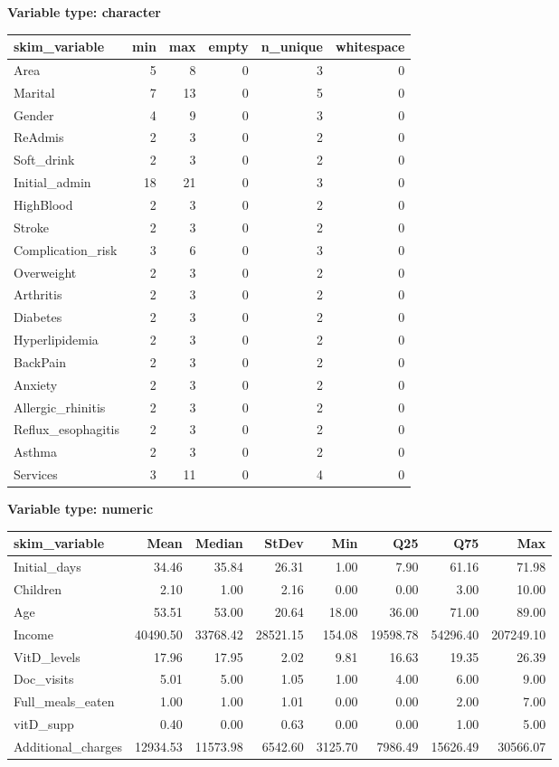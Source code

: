 \documentclass[
]{article}
\begin{document}
\textbf{Variable type: character}

\begin{longtable}[]{@{}lrrrrr@{}}
\toprule
skim\_variable & min & max & empty & n\_unique & whitespace \\
\midrule
\endhead
Area & 5 & 8 & 0 & 3 & 0 \\
Marital & 7 & 13 & 0 & 5 & 0 \\
Gender & 4 & 9 & 0 & 3 & 0 \\
ReAdmis & 2 & 3 & 0 & 2 & 0 \\
Soft\_drink & 2 & 3 & 0 & 2 & 0 \\
Initial\_admin & 18 & 21 & 0 & 3 & 0 \\
HighBlood & 2 & 3 & 0 & 2 & 0 \\
Stroke & 2 & 3 & 0 & 2 & 0 \\
Complication\_risk & 3 & 6 & 0 & 3 & 0 \\
Overweight & 2 & 3 & 0 & 2 & 0 \\
Arthritis & 2 & 3 & 0 & 2 & 0 \\
Diabetes & 2 & 3 & 0 & 2 & 0 \\
Hyperlipidemia & 2 & 3 & 0 & 2 & 0 \\
BackPain & 2 & 3 & 0 & 2 & 0 \\
Anxiety & 2 & 3 & 0 & 2 & 0 \\
Allergic\_rhinitis & 2 & 3 & 0 & 2 & 0 \\
Reflux\_esophagitis & 2 & 3 & 0 & 2 & 0 \\
Asthma & 2 & 3 & 0 & 2 & 0 \\
Services & 3 & 11 & 0 & 4 & 0 \\
\bottomrule
\end{longtable}

\textbf{Variable type: numeric}

\begin{longtable}[]{@{}lrrrrrrr@{}}
\toprule
skim\_variable & Mean & Median & StDev & Min & Q25 & Q75 & Max \\
\midrule
\endhead
Initial\_days & 34.46 & 35.84 & 26.31 & 1.00 & 7.90 & 61.16 & 71.98 \\
Children & 2.10 & 1.00 & 2.16 & 0.00 & 0.00 & 3.00 & 10.00 \\
Age & 53.51 & 53.00 & 20.64 & 18.00 & 36.00 & 71.00 & 89.00 \\
Income & 40490.50 & 33768.42 & 28521.15 & 154.08 & 19598.78 & 54296.40 &
207249.10 \\
VitD\_levels & 17.96 & 17.95 & 2.02 & 9.81 & 16.63 & 19.35 & 26.39 \\
Doc\_visits & 5.01 & 5.00 & 1.05 & 1.00 & 4.00 & 6.00 & 9.00 \\
Full\_meals\_eaten & 1.00 & 1.00 & 1.01 & 0.00 & 0.00 & 2.00 & 7.00 \\
vitD\_supp & 0.40 & 0.00 & 0.63 & 0.00 & 0.00 & 1.00 & 5.00 \\
Additional\_charges & 12934.53 & 11573.98 & 6542.60 & 3125.70 & 7986.49
& 15626.49 & 30566.07 \\
\bottomrule
\end{longtable}
\end{document}

